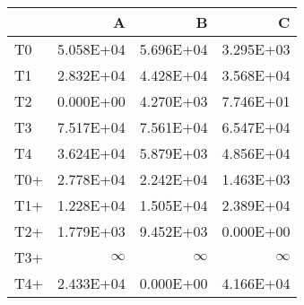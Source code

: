 \begin{tabular}{lrrr}
\toprule
     &           A &           B &           C \\
\midrule
 T0  &   \num{5.058E+04} &   \num{5.696E+04} &   \num{3.295E+03} \\
 T1  &   \num{2.832E+04} &   \num{4.428E+04} &   \num{3.568E+04} \\
 T2  &   \num{0.000E+00} &   \num{4.270E+03} &   \num{7.746E+01} \\
 T3  &   \num{7.517E+04} &   \num{7.561E+04} &   \num{6.547E+04} \\
 T4  &   \num{3.624E+04} &   \num{5.879E+03} &   \num{4.856E+04} \\
 T0+ &   \num{2.778E+04} &   \num{2.242E+04} &   \num{1.463E+03} \\
 T1+ &   \num{1.228E+04} &   \num{1.505E+04} &   \num{2.389E+04} \\
 T2+ &   \num{1.779E+03} &   \num{9.452E+03} &   \num{0.000E+00} \\
 T3+ &$\infty$        &$\infty$        &$\infty$        \\
 T4+ &   \num{2.433E+04} &   \num{0.000E+00} &   \num{4.166E+04} \\
\bottomrule
\end{tabular}